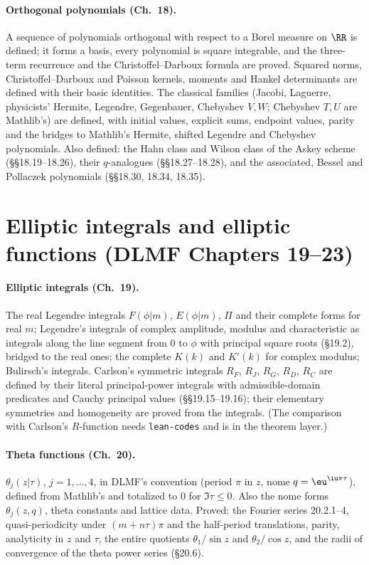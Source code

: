 \documentclass[11pt,a4paper]{article}
\begin{document}
\paragraph{Orthogonal polynomials (Ch.~18).} A sequence of polynomials orthogonal with respect to a
Borel measure on $\RR$ is defined; it forms a basis, every polynomial is square integrable, and
the three-term recurrence and the Christoffel--Darboux formula are proved. Squared norms,
Christoffel--Darboux and Poisson kernels, moments and Hankel determinants are defined with their
basic identities. The classical families (Jacobi, Laguerre, physicists' Hermite, Legendre,
Gegenbauer, Chebyshev $V,W$; Chebyshev $T,U$ are Mathlib's) are defined, with initial values,
explicit sums, endpoint values, parity and the bridges to Mathlib's Hermite, shifted Legendre and
Chebyshev polynomials. Also defined: the Hahn class and Wilson class of the Askey scheme
(\S\S18.19--18.26), their $q$-analogues (\S\S18.27--18.28), and the associated, Bessel and Pollaczek
polynomials (\S\S18.30, 18.34, 18.35).

\section{Elliptic integrals and elliptic functions (DLMF Chapters 19--23)}

\paragraph{Elliptic integrals (Ch.~19).} The real Legendre integrals $F(\phi|m)$, $E(\phi|m)$,
$\Pi$ and their complete forms for real $m$; Legendre's integrals of complex amplitude, modulus
and characteristic as integrals along the line segment from $0$ to $\phi$ with principal square
roots (\S19.2), bridged to the real ones; the complete $K(k)$ and $K'(k)$ for complex modulus;
Bulirsch's integrals. Carlson's symmetric integrals $R_F$, $R_J$, $R_G$, $R_D$, $R_C$ are defined
by their literal principal-power integrals with admissible-domain predicates and Cauchy principal
values (\S\S19.15--19.16); their elementary symmetries and homogeneity are proved from the
integrals. (The comparison with Carlson's $R$-function needs \texttt{lean-codes} and is in the
theorem layer.)

\paragraph{Theta functions (Ch.~20).} $\theta_j(z|\tau)$, $j=1,\dots,4$, in DLMF's convention
(period $\pi$ in $z$, nome $q=\eu^{\iu\pi\tau}$), defined from Mathlib's 
and totalized to $0$ for $\Im\tau\le0$. Also the nome forms $\theta_j(z,q)$, theta constants and
lattice data. Proved: the Fourier series 20.2.1--4, quasi-periodicity under $(m+n\tau)\pi$ and the
half-period translations, parity, analyticity in $z$ and $\tau$, the entire quotients
$\theta_1/\sin z$ and $\theta_2/\cos z$, and the radii of convergence of the theta power series
(\S20.6).
\end{document}
